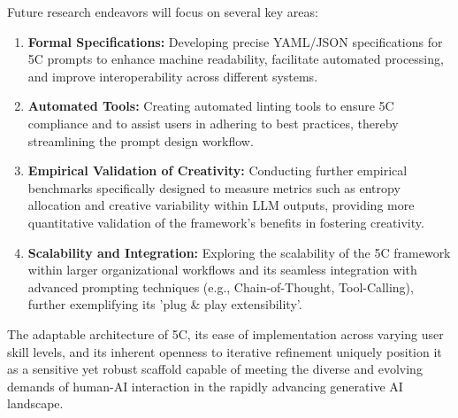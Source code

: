 \documentclass[10pt, a4paper]{article}
\begin{document}
Future research endeavors will focus on several key areas:
\begin{enumerate}
    \item \textbf{Formal Specifications:} Developing precise YAML/JSON specifications for 5C prompts to enhance machine readability, facilitate automated processing, and improve interoperability across different systems.
    \item \textbf{Automated Tools:} Creating automated linting tools to ensure 5C compliance and to assist users in adhering to best practices, thereby streamlining the prompt design workflow.
    \item \textbf{Empirical Validation of Creativity:} Conducting further empirical benchmarks specifically designed to measure metrics such as entropy allocation and creative variability within LLM outputs, providing more quantitative validation of the framework's benefits in fostering creativity.
    \item \textbf{Scalability and Integration:} Exploring the scalability of the 5C framework within larger organizational workflows and its seamless integration with advanced prompting techniques (e.g., Chain-of-Thought, Tool-Calling), further exemplifying its 'plug \& play extensibility'.
\end{enumerate}
The adaptable architecture of 5C, its ease of implementation across varying user skill levels, and its inherent openness to iterative refinement uniquely position it as a sensitive yet robust scaffold capable of meeting the diverse and evolving demands of human-AI interaction in the rapidly advancing generative AI landscape.



\end{document}
